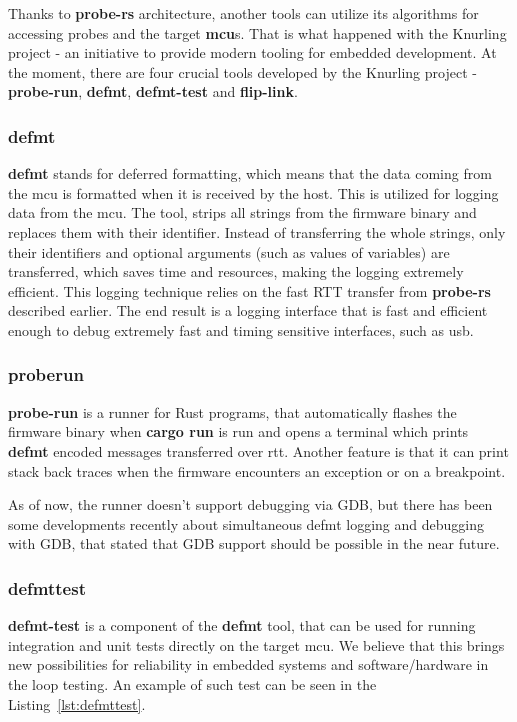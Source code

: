 Thanks to \textbf{probe-rs} architecture, another tools can utilize its algorithms for accessing probes and the target \textbf{mcu}s.
That is what happened with the Knurling project - an initiative to provide modern tooling for embedded development.
At the moment, there are four crucial tools developed by the Knurling project - \textbf{probe-run}, \textbf{defmt}, \textbf{defmt-test} and \textbf{flip-link}.

\subsubsection{defmt}
\textbf{defmt} stands for deferred formatting\cite{knurling_project_knurling-rsdefmt_2021}, which means that the data coming from the \acs{mcu} is formatted when it is received by the host.
This is utilized for logging data from the \acs{mcu}.
The tool, strips all strings from the firmware binary and replaces them with their identifier.
Instead of transferring the whole strings, only their identifiers and optional arguments (such as values of variables) are transferred, which saves time and resources, making the logging extremely efficient.
This logging technique relies on the fast RTT transfer from \textbf{probe-rs} described earlier.
The end result is a logging interface that is fast and efficient enough to debug extremely fast and timing sensitive interfaces, such as \acs{usb}.

\subsubsection{probe\textendash run}
\textbf{probe-run} is a runner for Rust programs\cite{knurling_project_knurling-rsprobe-run_2021}, that automatically flashes the firmware binary when \textbf{cargo run} is run and opens a terminal which prints \textbf{defmt} encoded messages transferred over \acs{rtt}.
Another feature is that it can print stack back traces when the firmware encounters an exception or on a breakpoint.

As of now, the runner doesn't support debugging via GDB, but there has been some developments recently about simultaneous defmt logging and debugging with GDB, that stated that GDB support should be possible in the near future\cite{aparicio_using_nodate}.

\subsubsection{defmt\textendash test}
\label{subsubsec:defmttest}
\textbf{defmt-test} is a component of the \textbf{defmt} tool, that can be used for running integration and unit tests directly on the target \acs{mcu}.
We believe that this brings new possibilities for reliability in embedded systems and software/hardware in the loop testing.
An example of such test can be seen in the Listing~\ref{lst:defmttest}.

